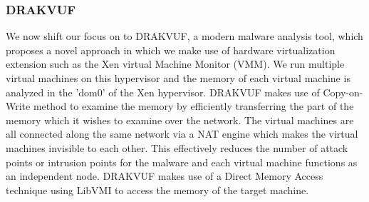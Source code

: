 \documentclass[11pt]{article}
\begin{document}
	\subsubsection{DRAKVUF}
	We now shift our focus on to DRAKVUF, a modern malware analysis tool, which proposes a novel approach in which we make use of hardware virtualization extension such as the Xen virtual Machine Monitor (VMM). We run multiple virtual machines on this hypervisor and the memory of each virtual machine is analyzed in the 'dom0' of the Xen hypervisor. DRAKVUF makes use of Copy-on-Write method to examine the memory by efficiently transferring the part of the memory which it wishes to examine over the network. The virtual machines are all connected along the same network via a NAT engine which makes the virtual machines invisible to each other. This effectively reduces the number of attack points or intrusion points for the malware and each virtual machine functions as an independent node. DRAKVUF makes use of a Direct Memory Access technique using LibVMI to access the memory of the target machine.\\ \\
\end{document}
